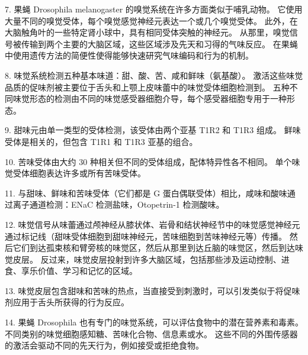 7. 果蝇 Drosophila melanogaster 的嗅觉系统在许多方面类似于哺乳动物。
它使用大量不同的嗅觉受体，每个嗅觉感觉神经元表达一个或几个嗅觉受体。
此外，在大脑触角叶的一些特定肾小球中，具有相同受体突触的神经元。
从那里，嗅觉信号被传输到两个主要的大脑区域，这些区域涉及先天和习得的气味反应。
在果蝇中使用遗传方法的简便性使得能够快速研究气味编码和行为的机制。


8. 味觉系统检测五种基本味道：甜、酸、苦、咸和鲜味（氨基酸）。
激活这些味觉品质的促味剂被主要位于舌头和上颚上皮味蕾中的味觉受体细胞检测到。
五种不同味觉形态的检测由不同的味觉感受器细胞介导，每个感受器细胞专用于一种形态。


9. 甜味元由单一类型的受体检测，该受体由两个亚基 T1R2 和 T1R3 组成。
鲜味受体是相关的，但包含 T1R1 和 T1R3 亚基的组合。


10. 苦味受体由大约 30 种相关但不同的受体组成，配体特异性各不相同。
单个味觉受体细胞表达许多或所有苦味受体。 


11. 与甜味、鲜味和苦味受体（它们都是 G 蛋白偶联受体）相比，咸味和酸味通过离子通道检测：ENaC 检测盐味，Otopetrin-1 检测酸味。 


12. 味觉信号从味蕾通过颅神经从膝状体、岩骨和结状神经节中的味觉感觉神经元通过标记线（甜味受体细胞到甜味神经元，苦味细胞到苦味神经元等）传播。
然后它们到达孤束核和臂旁核的味觉区，然后从那里到达丘脑的味觉区，然后到达味觉皮层。
反过来，味觉皮层投射到许多大脑区域，包括那些涉及运动控制、进食、享乐价值、学习和记忆的区域。


13. 味觉皮层包含甜味和苦味的热点，当直接受到刺激时，可以引发类似于将促味剂应用于舌头所获得的行为反应。 


14. 果蝇 Drosophila 也有专门的味觉系统，可以评估食物中的潜在营养素和毒素。
不同类别的味觉细胞感知糖、苦味化合物、信息素或水。 
这些不同的外围传感器的激活会驱动不同的先天行为，例如接受或拒绝食物。


